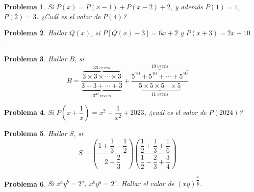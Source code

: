 \documentclass[12pt]{beamer}
\newtheorem{section-problem}{Problema}
\begin{document}
   \begin{frame}
      \begin{section-problem}
         Si $P(x) =  P(x - 1) + P(x - 2) + 2$, y además $P(1) = 1$, $P(2) = 3$.
         ¿Cuál es el valor de $P(4)$?
      \end{section-problem}
   \end{frame}

   \begin{frame}
      \begin{section-problem}
         Hallar $Q(x)$, si $P\left[Q(x) - 3\right] = 6x + 2$ y $P(x + 3) = 2x + 10$.
      \end{section-problem}
   \end{frame}

   \begin{frame}
      \begin{section-problem}
         Hallar $B$, si
         \[
            B = \frac{\overbrace{3 \times 3 \times \cdots \times 3}^{33 \ veces}}{\underbrace{3 + 3 +  \cdots + 3}_{3^{30}\ veces}}
            + \frac{\overbrace{5^{10} + 5^{10} + \cdots + 5^{10}}^{10 \ veces}}{\underbrace{5 \times 5 \times 5 \cdots \times 5}_{11 \ veces}}
         \]
      \end{section-problem}
   \end{frame}

   \begin{frame}
      \begin{section-problem}
         Si $P\left(x + \dfrac{1}{x}\right) = x^2 + \dfrac{1}{x^2} + 2023$, ¿cuál es el valor de $P(2024)$?
      \end{section-problem}
   \end{frame}

   \begin{frame}
      \begin{section-problem}
         Hallar $S$, si
         \[S = \left( \frac{1 + \dfrac{1}{3} - \dfrac{1}{2}}{2 - \dfrac{2}{3}} \right) \left( \frac{\dfrac{1}{2} + \dfrac{1}{3} + \dfrac{1}{6}}{\dfrac{1}{2} - \dfrac{2}{3} + \dfrac{3}{4}} \right)\]
      \end{section-problem}
   \end{frame}

   \begin{frame}

      \begin{section-problem}
         Si $x^a y^b = 2^a$, $x^b y^a = 2^b$.
         Hallar el valor de $(xy)^{\dfrac{x}{y}}.$
      \end{section-problem}
   \end{frame}
\end{document}
